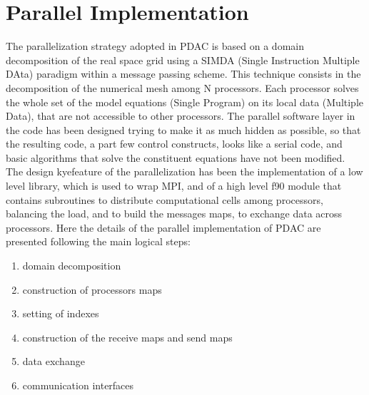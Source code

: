 \section{Parallel Implementation}
%
The parallelization strategy adopted in PDAC is based on a domain decomposition
of the real space grid using a SIMDA (Single Instruction Multiple DAta) paradigm
within a message passing scheme. This technique consists in the decomposition
of the numerical mesh among N processors. Each processor solves the whole set of
the model equations (Single Program) on its local data (Multiple Data),
that are not accessible to other processors.
%
The parallel software layer in the code has been designed trying to make it as much 
hidden as possible, so that the resulting code, a part few control constructs,
looks like a serial code, and basic algorithms that solve the constituent equations
have not been modified.
The design kyefeature of the parallelization has been the implementation of a 
low level library, which is used
to wrap MPI, and of a high level f90 module that contains subroutines
to distribute computational cells among processors, balancing the load, and to build the 
messages maps, to exchange data across processors.  
Here the details of the parallel implementation of PDAC are
presented following the main logical steps:
\begin{enumerate}
\item domain decomposition
\item construction of processors maps
\item setting of indexes
\item construction of the receive maps and send maps
\item data exchange
\item communication interfaces
\end{enumerate}
% 
